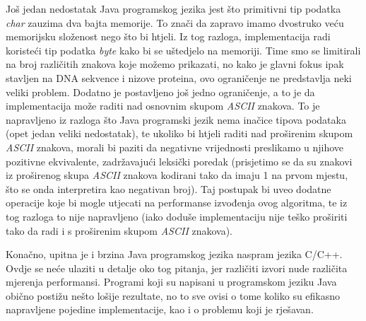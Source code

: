 Još jedan nedostatak Java programskog jezika jest što primitivni tip podatka \textit{char} zauzima dva bajta memorije. To znači da zapravo imamo dvostruko veću memorijsku složenost nego što bi htjeli. Iz tog razloga, implementacija radi koristeći tip podatka \textit{byte} kako bi se uštedjelo na memoriji. Time smo se limitirali na broj različitih znakova koje možemo prikazati, no kako je glavni fokus ipak stavljen na DNA sekvence i nizove proteina, ovo ograničenje ne predstavlja neki veliki problem. Dodatno je postavljeno još jedno ograničenje, a to je da implementacija može raditi nad osnovnim skupom \textit{ASCII} znakova. To je napravljeno iz razloga što Java programski jezik nema  inačice tipova podataka (opet jedan veliki nedostatak), te ukoliko bi htjeli raditi nad proširenim skupom \textit{ASCII} znakova, morali bi paziti da negativne vrijednosti preslikamo u njihove pozitivne ekvivalente, zadržavajući leksički poredak (prisjetimo se da su znakovi iz proširenog skupa \textit{ASCII} znakova kodirani tako da imaju 1 na prvom mjestu, što se onda interpretira kao negativan broj). Taj postupak bi uveo dodatne operacije koje bi mogle utjecati na performanse izvođenja ovog algoritma, te iz tog razloga to nije napravljeno (iako doduše implementaciju nije teško proširiti tako da radi i s proširenim skupom \textit{ASCII} znakova). 

Konačno, upitna je i brzina Java programskog jezika naspram jezika C/C++. Ovdje se neće ulaziti u detalje oko tog pitanja, jer različiti izvori nude različita mjerenja performansi. Programi koji su napisani u programskom jeziku Java obično postižu nešto lošije rezultate, no to sve ovisi o tome koliko su efikasno napravljene pojedine implementacije, kao i o problemu koji je rješavan. 



\nocite{fm3}